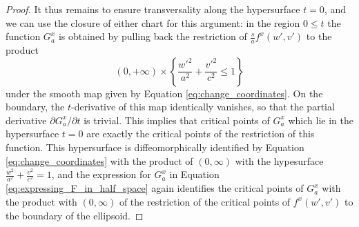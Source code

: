 \documentclass[10pt,a4paper]{amsart}
\begin{document}
\begin{proof}
It thus remains to ensure transversality along the hypersurface $t=0$, and we can use the closure of either chart for this argument:  in the region $0 \leq t$ the function $G^x_a$ is obtained by pulling back the restriction of $ \frac{s}{a}f^x(w',v')$ to the product
\begin{equation}
    (0,+\infty)\times \left\{\frac{w'^2}{a^2}+\frac{v'^2}{c^2} \leq  1\right\}
\end{equation}
under the smooth map given by Equation \eqref{eq:change_coordinates}. On the boundary, the $t$-derivative of this map identically vanishes, so that the partial derivative $\partial G^x_a / \partial t$ is trivial. This implies that critical points of $G^x_a$ which lie in the hypersurface $t=0$ are exactly the critical points of the restriction of this function. This hypersurface is diffeomorphically identified by Equation \eqref{eq:change_coordinates} with the product of $(0,\infty)$ with the hypesurface $ \frac{w^2}{a^2}+\frac{v^2}{c^2} = 1$, and the expression for $G^x_a$ in Equation \eqref{eq:expressing_F_in_half_space} again identifies the critical points of $G^x_a$ with the product with $(0,\infty) $ of the restriction of the critical points of $f^x(w',v')$ to the boundary of the ellipsoid.
\end{proof}
\end{document}
